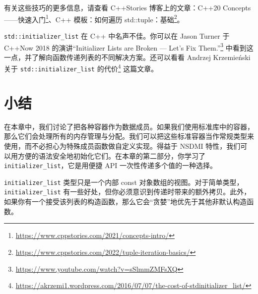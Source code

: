 有关这些技巧的更多信息，请查看 C++Stories 博客上的文章：C++20 Concepts——快速入门\footnote{\url{https://www.cppstories.com/2021/concepts-intro/}}、C++ 模板：如何遍历 std::tuple：基础\footnote{\url{https://www.cppstories.com/2022/tuple-iteration-basics/}}。

\begin{myInfoBox}
\texttt{std::initializer\_list} 在 C++ 中名声不佳。你可以在 Jason Turner 于 C++Now 2018 的演讲“Initializer Lists are Broken — Let's Fix Them.”\footnote{\url{https://www.youtube.com/watch?v=sSlmmZMFsXQ}} 中看到这一点，并了解向函数传递列表的不同解决方案。还可以看看 Andrzej Krzemieński 关于 \texttt{std::initializer\_list} 的代价\footnote{\url{https://akrzemi1.wordpress.com/2016/07/07/the-cost-of-stdinitializer_list/}} 这篇文章。
\end{myInfoBox}

\section{小结}

在本章中，我们讨论了把各种容器作为数据成员。如果我们使用标准库中的容器，那么它们会处理所有的内存管理与分配。我们可以把这些标准容器当作常规类型来使用，而不必担心为特殊成员函数做自定义实现。得益于 NSDMI 特性，我们可以用方便的语法安全地初始化它们。在本章的第二部分，你学习了 \texttt{initializer\_list}，它是用便捷 API 一次性传递多个值的一种选择。


\texttt{initializer\_list} 类型只是一个内部 const 对象数组的视图。对于简单类型，\texttt{initializer\_list} 有一些好处，但你必须意识到传递时带来的额外拷贝。此外，如果你有一个接受该列表的构造函数，那么它会“贪婪”地优先于其他非默认构造函数。
